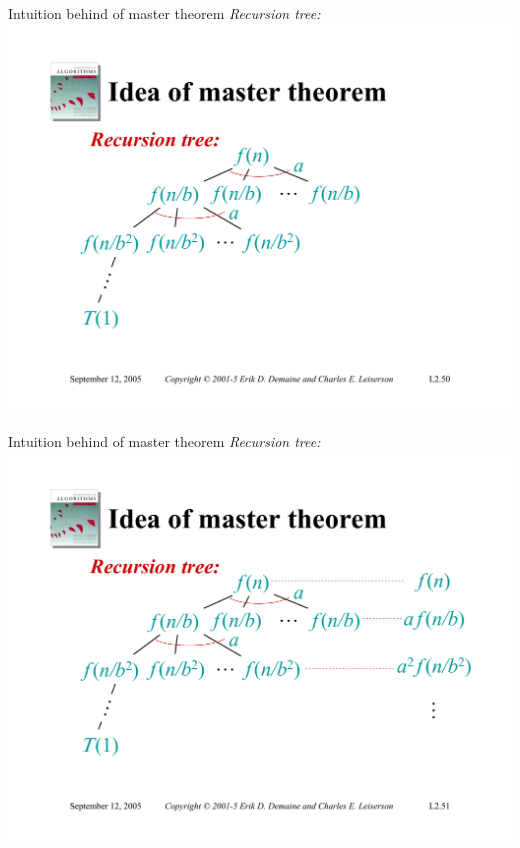 \documentclass{beamer}
\begin{document}
\begin{frame}{Intuition behind of master theorem}
    \textit{Recursion tree:}\\
    \vspace{5mm}
    \includegraphics[width=\textwidth, trim={1.10cm 1.20cm 0.30cm 5.50cm}, clip]{pages/lec2_50}
\end{frame}
\begin{frame}{Intuition behind of master theorem}
    \textit{Recursion tree:}\\
    \vspace{5mm}
    \includegraphics[width=\textwidth, trim={1.10cm 1.20cm 0.30cm 5.50cm}, clip]{pages/lec2_51}
\end{frame}
\end{document}
